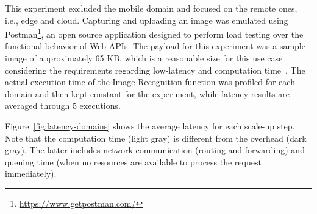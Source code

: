 This experiment excluded the mobile domain and focused on the remote ones, i.e., edge and cloud. Capturing and uploading an image was emulated using Postman\footnote{\url{https://www.getpostman.com/}}, an open source application designed to perform load testing over the functional behavior of Web APIs. The payload for this experiment was a sample image of approximately 65 KB, which is a reasonable size for this use case considering the requirements regarding low-latency and computation time~\cite{rodriguez16mobile}. The actual execution time of the Image Recognition function was profiled for each domain and then kept constant for the experiment, while latency results are averaged through $5$ executions.








 Figure~\ref{fig:latency-domains} shows the average latency for each scale-up step. Note that the computation time (light gray) is different from the overhead (dark gray). The latter includes network communication (routing and forwarding) and queuing time (when no resources are available to process the request immediately). 


